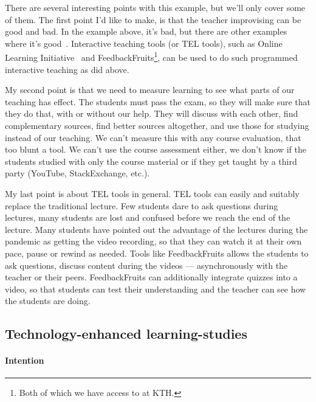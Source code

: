There are several interesting points with this example, but we'll only cover 
some of them.
The first point I'd like to make, is that the teacher improvising can be good 
and bad.
In the example above, it's bad, but there are other examples where it's 
good~\autocite[cf.][for good examples]{NecessaryConditionsOfLearning}.
Interactive teaching tools (or \ac{TEL} tools), such as Online Learning 
Initiative~\autocite{OLIstatistics} and FeedbackFruits\footnote{%
  Both of which we have access to at KTH.
}, can be used to do such programmed interactive teaching as 
\citeauthor{MeaningsAreAcquired} did above.

My second point is that we need to measure learning to see what parts of our 
teaching has effect.
The students must pass the exam, so they will make sure that they do that, with 
or without our help.
They will discuss with each other, find complementary sources, find better 
sources altogether, and use those for studying instead of our teaching.
We can't measure this with any course evaluation, that too blunt a tool.
We can't use the course assessment either, we don't know if the students 
studied with only the course material or if they get taught by a third party 
(YouTube, StackExchange, etc.).

My last point is about \ac{TEL} tools in general.
\Ac{TEL} tools can easily and suitably replace the traditional lecture.
Few students dare to ask questions during lectures, many students are lost and 
confused before we reach the end of the lecture.
Many students have pointed out the advantage of the lectures during the 
pandemic as getting the video recording, so that they can watch it at their own 
pace, pause or rewind as needed.
Tools like FeedbackFruits allows the students to ask questions, discuss content 
during the videos --- asynchronously with the teacher or their peers.
FeedbackFruits can additionally integrate quizzes into a video, so that 
students can test their understanding and the teacher can see how the students 
are doing.


\subsection{Technology-enhanced learning-studies}


\paragraph{Intention}

